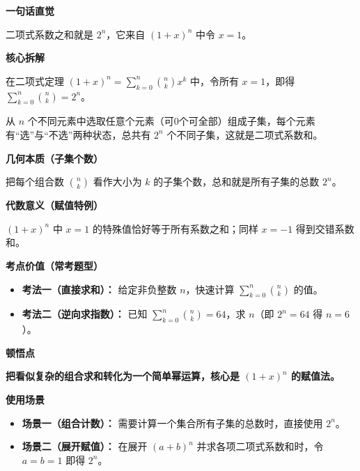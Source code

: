 \begin{explanationbox}
	\textbf{\textcolor{CExplanation}{一句话直觉}}

	二项式系数之和就是 $2^n$，它来自 $(1+x)^n$ 中令 $x=1$。

	\medskip
	\textbf{\textcolor{CExplanation}{核心拆解}}
	\begin{description}[style=nextline, leftmargin=2.8em, labelsep=0.5em, itemsep=0.45em]
		\item[\textbf{要点一（赋值推导）：}] 在二项式定理 $(1+x)^n=\sum_{k=0}^{n}\binom{n}{k}x^k$ 中，令所有 $x=1$，即得 $\sum_{k=0}^{n}\binom{n}{k}=2^n$。
		\item[\textbf{要点二（组合解释）：}] 从 $n$ 个不同元素中选取任意个元素（可0个可全部）组成子集，每个元素有“选”与“不选”两种状态，总共有 $2^n$ 个不同子集，这就是二项式系数和。
	\end{description}

	\medskip
	\textbf{\textcolor{CExplanation}{几何本质（子集个数）}}

	把每个组合数 $\binom{n}{k}$ 看作大小为 $k$ 的子集个数，总和就是所有子集的总数 $2^n$。

	\medskip
	\textbf{\textcolor{CExplanation}{代数意义（赋值特例）}}

	$(1+x)^n$ 中 $x=1$ 的特殊值恰好等于所有系数之和；同样 $x=-1$ 得到交错系数和。

	\medskip
	\textbf{\textcolor{CExplanation}{考点价值（常考题型）}}
	\begin{itemize}[leftmargin=*, itemsep=0.5em, topsep=0.4em]
		\item \textbf{考法一（直接求和）：} 给定非负整数 $n$，快速计算 $\sum_{k=0}^{n}\binom{n}{k}$ 的值。
		\item \textbf{考法二（逆向求指数）：} 已知 $\sum_{k=0}^{n}\binom{n}{k} = 64$，求 $n$（即 $2^n=64$ 得 $n=6$）。
	\end{itemize}

	\medskip
	\textbf{\textcolor{CExplanation}{顿悟点}}

	\textbf{把看似复杂的组合求和转化为一个简单幂运算，核心是 $(1+x)^n$ 的赋值法。}

	\medskip
	\textbf{\textcolor{CExplanation}{使用场景}}
	\begin{itemize}[leftmargin=*, itemsep=0.5em, topsep=0.4em]
		\item \textbf{场景一（组合计数）：} 需要计算一个集合所有子集的总数时，直接使用 $2^n$。
		\item \textbf{场景二（展开赋值）：} 在展开 $(a+b)^n$ 并求各项二项式系数和时，令 $a=b=1$ 即得 $2^n$。
	\end{itemize}
\end{explanationbox}
